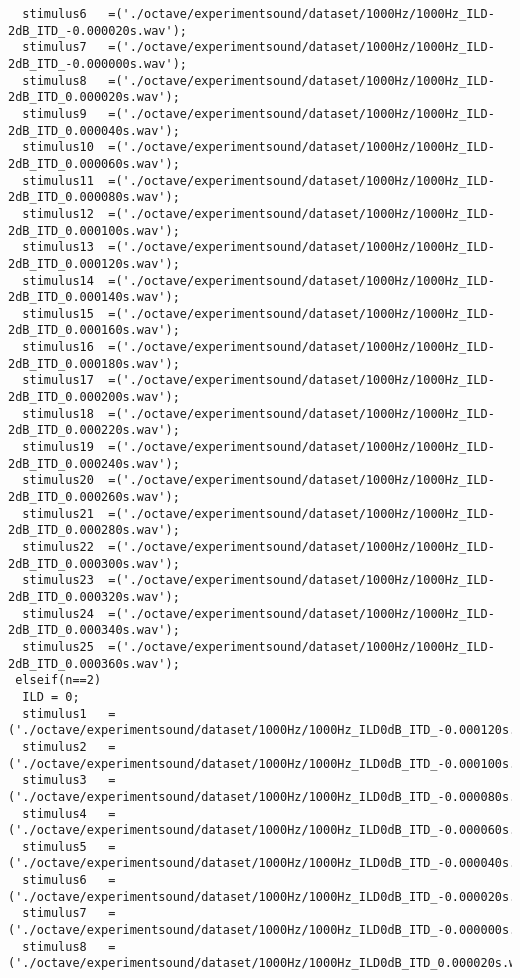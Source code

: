 {\begin{verbatim}
  stimulus6   =('./octave/experimentsound/dataset/1000Hz/1000Hz_ILD-2dB_ITD_-0.000020s.wav');
  stimulus7   =('./octave/experimentsound/dataset/1000Hz/1000Hz_ILD-2dB_ITD_-0.000000s.wav');
  stimulus8   =('./octave/experimentsound/dataset/1000Hz/1000Hz_ILD-2dB_ITD_0.000020s.wav');
  stimulus9   =('./octave/experimentsound/dataset/1000Hz/1000Hz_ILD-2dB_ITD_0.000040s.wav');
  stimulus10  =('./octave/experimentsound/dataset/1000Hz/1000Hz_ILD-2dB_ITD_0.000060s.wav');
  stimulus11  =('./octave/experimentsound/dataset/1000Hz/1000Hz_ILD-2dB_ITD_0.000080s.wav');
  stimulus12  =('./octave/experimentsound/dataset/1000Hz/1000Hz_ILD-2dB_ITD_0.000100s.wav');
  stimulus13  =('./octave/experimentsound/dataset/1000Hz/1000Hz_ILD-2dB_ITD_0.000120s.wav');
  stimulus14  =('./octave/experimentsound/dataset/1000Hz/1000Hz_ILD-2dB_ITD_0.000140s.wav');
  stimulus15  =('./octave/experimentsound/dataset/1000Hz/1000Hz_ILD-2dB_ITD_0.000160s.wav');
  stimulus16  =('./octave/experimentsound/dataset/1000Hz/1000Hz_ILD-2dB_ITD_0.000180s.wav');
  stimulus17  =('./octave/experimentsound/dataset/1000Hz/1000Hz_ILD-2dB_ITD_0.000200s.wav');
  stimulus18  =('./octave/experimentsound/dataset/1000Hz/1000Hz_ILD-2dB_ITD_0.000220s.wav');
  stimulus19  =('./octave/experimentsound/dataset/1000Hz/1000Hz_ILD-2dB_ITD_0.000240s.wav');
  stimulus20  =('./octave/experimentsound/dataset/1000Hz/1000Hz_ILD-2dB_ITD_0.000260s.wav');
  stimulus21  =('./octave/experimentsound/dataset/1000Hz/1000Hz_ILD-2dB_ITD_0.000280s.wav');
  stimulus22  =('./octave/experimentsound/dataset/1000Hz/1000Hz_ILD-2dB_ITD_0.000300s.wav');
  stimulus23  =('./octave/experimentsound/dataset/1000Hz/1000Hz_ILD-2dB_ITD_0.000320s.wav');
  stimulus24  =('./octave/experimentsound/dataset/1000Hz/1000Hz_ILD-2dB_ITD_0.000340s.wav');
  stimulus25  =('./octave/experimentsound/dataset/1000Hz/1000Hz_ILD-2dB_ITD_0.000360s.wav');
 elseif(n==2)
  ILD = 0;
  stimulus1   =('./octave/experimentsound/dataset/1000Hz/1000Hz_ILD0dB_ITD_-0.000120s.wav');
  stimulus2   =('./octave/experimentsound/dataset/1000Hz/1000Hz_ILD0dB_ITD_-0.000100s.wav');
  stimulus3   =('./octave/experimentsound/dataset/1000Hz/1000Hz_ILD0dB_ITD_-0.000080s.wav');
  stimulus4   =('./octave/experimentsound/dataset/1000Hz/1000Hz_ILD0dB_ITD_-0.000060s.wav');
  stimulus5   =('./octave/experimentsound/dataset/1000Hz/1000Hz_ILD0dB_ITD_-0.000040s.wav');
  stimulus6   =('./octave/experimentsound/dataset/1000Hz/1000Hz_ILD0dB_ITD_-0.000020s.wav');
  stimulus7   =('./octave/experimentsound/dataset/1000Hz/1000Hz_ILD0dB_ITD_-0.000000s.wav');
  stimulus8   =('./octave/experimentsound/dataset/1000Hz/1000Hz_ILD0dB_ITD_0.000020s.wav');

\end{verbatim}}
